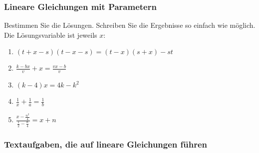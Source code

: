 \subsubsection{Lineare Gleichungen mit Parametern}

Bestimmen Sie die Lösungen. Schreiben Sie die Ergebnisse so einfach
wie möglich. Die Lösungsvariable ist jeweils $x$:

\begin{enumerate}[label=\alph*)]
\item $(t+x-s)(t-x-s) = (t-x)(s+x) - st$
\item $\frac{k-bx}{v} + x = \frac{vx-b}{v}$
\item $(k-4)x = 4k - k^2$
\item $\frac{1}{x} + \frac{1}{a} = \frac{1}{b}$
  \item $\frac{x- \frac{n^2}{4}}{\frac{1}{2} - \frac{n}{4}} = x+n$

\end{enumerate}



\subsubsection{Textaufgaben, die auf lineare Gleichungen führen}

